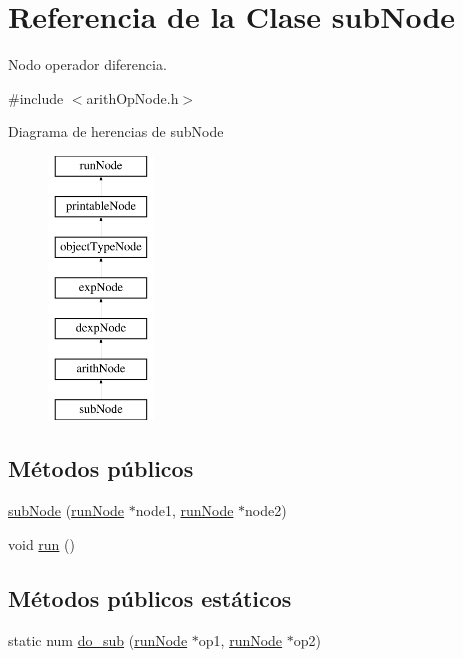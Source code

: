 \hypertarget{classsubNode}{\section{Referencia de la Clase sub\-Node}
\label{classsubNode}
}


Nodo operador diferencia.  




{\ttfamily \#include $<$arith\-Op\-Node.\-h$>$}

Diagrama de herencias de sub\-Node\begin{figure}[H]
\begin{center}
\leavevmode
\includegraphics[height=7.000000cm]{classsubNode}
\end{center}
\end{figure}
\subsection*{Métodos públicos}
\begin{DoxyCompactItemize}
\item 
\hyperlink{classsubNode_af93c0654d8ed0c2e16a538a24bb95381}{sub\-Node} (\hyperlink{classrunNode}{run\-Node} $\ast$node1, \hyperlink{classrunNode}{run\-Node} $\ast$node2)
\item 
void \hyperlink{classsubNode_add0c5dd4579e62476c941333d5bc1577}{run} ()
\end{DoxyCompactItemize}
\subsection*{Métodos públicos estáticos}
\begin{DoxyCompactItemize}
\item 
static num \hyperlink{classsubNode_a16a3738092d3d6a1d322064fc3662064}{do\-\_\-sub} (\hyperlink{classrunNode}{run\-Node} $\ast$op1, \hyperlink{classrunNode}{run\-Node} $\ast$op2)
\end{DoxyCompactItemize}
